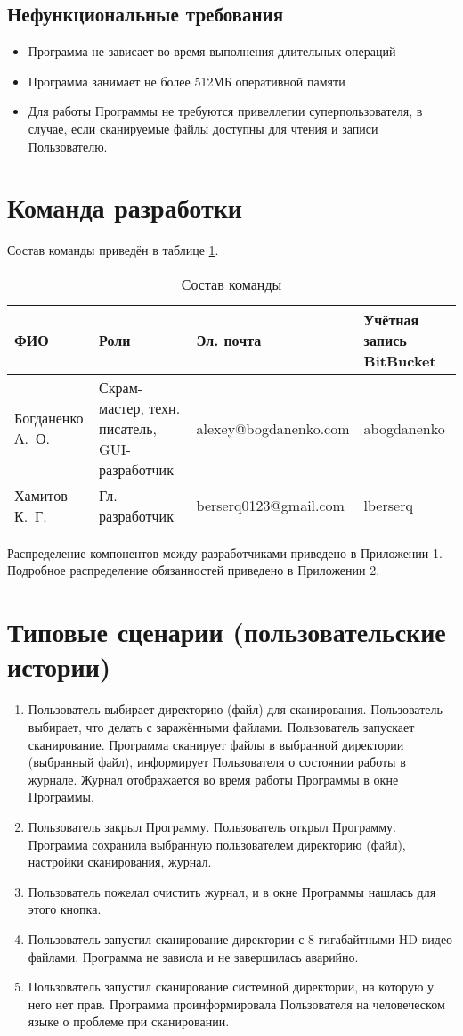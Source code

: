 \subsection{Нефункциональные требования}
\begin{itemize}
\item Программа не зависает во время выполнения длительных операций
\item Программа занимает не более 512МБ оперативной памяти
\item Для работы Программы не требуются привеллегии суперпользователя, в случае, если сканируемые файлы доступны для чтения и записи Пользователю.
\end{itemize}
\section{Команда разработки}
Состав команды приведён в таблице \ref{table:team}.
\begin{table}[h]
\centering
\begin{tabular}{|p{25mm}|p{35mm}|l|p{25mm}|}
\hline
ФИО & Роли & Эл. почта & Учётная запись BitBucket \\
\hline
Богданенко А.~О. & Скрам-мастер, техн. писатель, GUI-разработчик & alexey@bogdanenko.com & abogdanenko \\
\hline
Хамитов К.~Г. & Гл. разработчик & berserq0123@gmail.com & lberserq \\
\hline
\end{tabular}
\caption{Состав команды}
\label{table:team}
\end{table}
Распределение компонентов между разработчиками приведено в Приложении 1. Подробное распределение обязанностей приведено в Приложении 2.
\section{Типовые сценарии (пользовательские истории)}
\begin{enumerate}
\item Пользователь выбирает директорию (файл) для сканирования. Пользователь выбирает, что делать с заражёнными файлами. Пользователь запускает сканирование. Программа сканирует файлы в выбранной директории (выбранный файл), информирует Пользователя о состоянии работы в журнале. Журнал отображается во время работы Программы в окне Программы.
\item Пользователь закрыл Программу. Пользователь открыл Программу. Программа сохранила выбранную пользователем директорию (файл), настройки сканирования, журнал.
\item Пользователь пожелал очистить журнал, и в окне Программы нашлась для этого кнопка.
\item Пользователь запустил сканирование директории с 8-гигабайтными HD-видео файлами. Программа не зависла и не завершилась аварийно.
\item Пользователь запустил сканирование системной директории, на которую у него нет прав. Программа проинформировала Пользователя на человеческом языке о проблеме при сканировании.
\end{enumerate}
